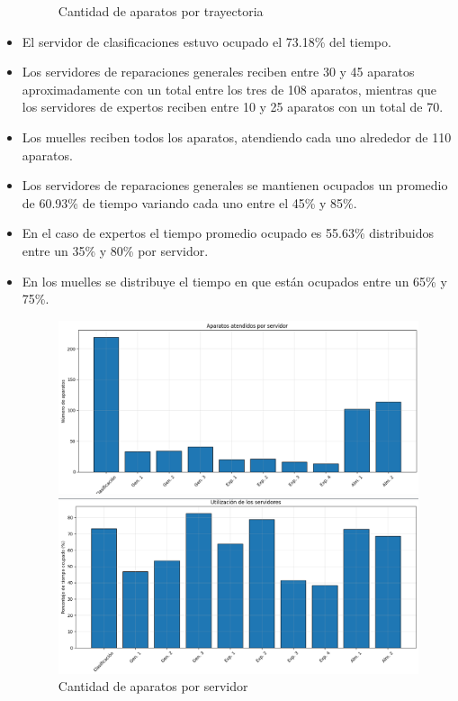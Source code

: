 \documentclass[12pt]{article}
\begin{document}
\begin{itemize}
\begin{figure}[H]
        \caption{Cantidad de aparatos por trayectoria}
        \label{fig: Cantidad de aparatos por trayectoria}
    \end{figure}
    \item El servidor de clasificaciones estuvo ocupado el 73.18\% del tiempo.
    \item Los servidores de reparaciones generales reciben entre 30 y 45 aparatos aproximadamente con un total entre los tres de 108 aparatos, mientras que los servidores de expertos reciben entre 10 y 25 aparatos con un total de 70.
    \item Los muelles reciben todos los aparatos, atendiendo cada uno alrededor de 110 aparatos.
    \item Los servidores de reparaciones generales se mantienen ocupados un promedio de 60.93\% de tiempo variando cada uno entre el 45\% y 85\%.
    \item En el caso de expertos el tiempo promedio ocupado es 55.63\% distribuidos entre un 35\% y 80\% por servidor.
    \item En los muelles se distribuye el tiempo en que están ocupados entre un 65\% y 75\%.
    \begin{figure}[H]
        \centering
        \begin{minipage}{0.45\textwidth}
            \centering
            \includegraphics[width=\textwidth]{server_appliences.png}
            \caption{Cantidad de aparatos por servidor}
            \label{fig: Cantidad de aparatos por servidor}
        \end{minipage}
        \hfill
        \begin{minipage}{0.45\textwidth}
            \centering
            \includegraphics[width=\textwidth]{server_utilization.png}

\end{minipage}
\end{figure}
\end{itemize}
\end{document}
